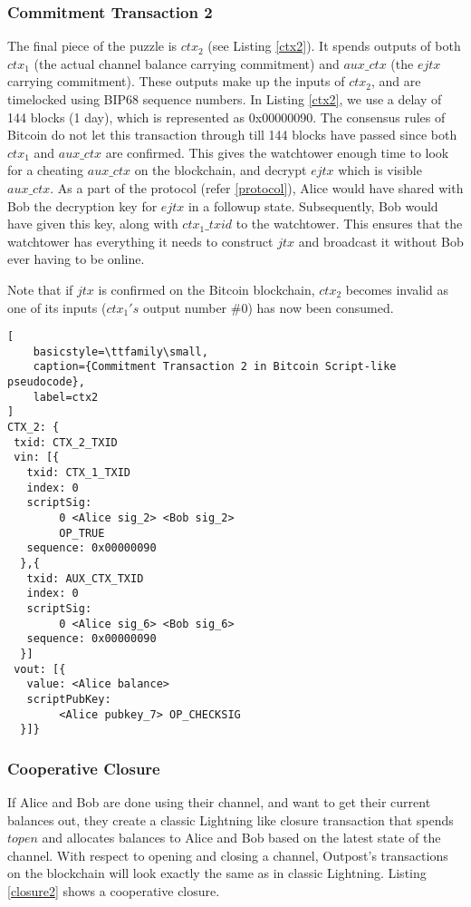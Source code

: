 \subsubsection{Commitment Transaction 2}
The final piece of the puzzle is $\mathit{ctx_2}$ (see Listing \ref{ctx2}). It spends outputs of both $\mathit{ctx_1}$ (the actual channel balance carrying commitment) and $\mathit{aux\_ctx}$ (the $\mathit{ejtx}$ carrying commitment). These outputs make up the inputs of $\mathit{ctx_2}$, and are timelocked using BIP68 \cite{BIP68} sequence numbers. In Listing \ref{ctx2}, we use a delay of 144 blocks (1 day), which is represented as 0x00000090. The consensus rules of Bitcoin do not let this transaction through till 144 blocks have passed since both $\mathit{ctx_1}$ and $\mathit{aux\_ctx}$ are confirmed. This gives the watchtower enough time to look for a cheating $\mathit{aux\_ctx}$ on the blockchain, and decrypt $\mathit{ejtx}$ which is visible $\mathit{aux\_ctx}$. As a part of the protocol (refer \ref{protocol}), Alice would have shared with Bob the decryption key for $\mathit{ejtx}$ in a followup state. Subsequently, Bob would have given this key, along with $\mathit{ctx_1\_txid}$ to the watchtower. This ensures that the watchtower has everything it needs to construct $\mathit{jtx}$ and broadcast it without Bob ever having to be online. 

Note that if $\mathit{jtx}$ is confirmed on the Bitcoin blockchain, $\mathit{ctx_2}$ becomes invalid as one of its inputs ($\mathit{ctx_1's}$ output number \#0) has now been consumed. 

\begin{lstlisting}[
    basicstyle=\ttfamily\small,
    caption={Commitment Transaction 2 in Bitcoin Script-like pseudocode},
    label=ctx2
]
CTX_2: {
 txid: CTX_2_TXID
 vin: [{
   txid: CTX_1_TXID
   index: 0
   scriptSig: 
        0 <Alice sig_2> <Bob sig_2>
        OP_TRUE
   sequence: 0x00000090
  },{
   txid: AUX_CTX_TXID
   index: 0
   scriptSig: 
        0 <Alice sig_6> <Bob sig_6>
   sequence: 0x00000090
  }]
 vout: [{
   value: <Alice balance>
   scriptPubKey: 
        <Alice pubkey_7> OP_CHECKSIG
  }]}
\end{lstlisting}

\subsubsection{Cooperative Closure}
If Alice and Bob are done using their channel, and want to get their current balances out, they create a classic Lightning like closure transaction that spends $\mathit{topen}$ and allocates balances to Alice and Bob based on the latest state of the channel. With respect to opening and closing a channel, Outpost's transactions on the blockchain will look exactly the same as in classic Lightning. Listing \ref{closure2} shows a cooperative closure.

